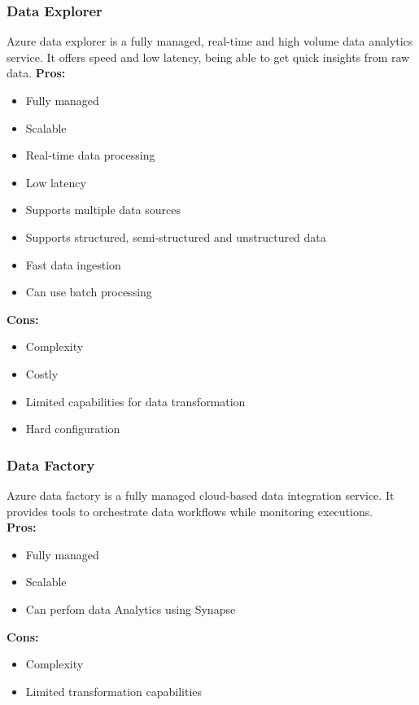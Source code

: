         \subsubsection{Data Explorer}
        \label{azure:data-explorer}
        Azure data explorer is a fully managed, real-time and high volume data analytics service. 
        It offers speed and low latency, being able to get quick insights from raw data.
        \textbf{Pros:}
        \begin{itemize}
            \item Fully managed
            \item Scalable
            \item Real-time data processing
            \item Low latency
            \item Supports multiple data sources
            \item Supports structured, semi-structured and unstructured data
            \item Fast data ingestion
            \item Can use batch processing
        \end{itemize}
        \textbf{Cons:}
        \begin{itemize}
            \item Complexity
            \item Costly
            \item Limited capabilities for data transformation
            \item Hard configuration
        \end{itemize}

        \subsubsection{Data Factory}
        \label{azure:data-factory}
        Azure data factory is a fully managed cloud-based data integration service.
        It provides tools to orchestrate data workflows while monitoring executions.\\
        \textbf{Pros:}
        \begin{itemize}
            \item Fully managed
            \item Scalable
            \item Can perfom data Analytics using Synapse
        \end{itemize}
        \textbf{Cons:}
        \begin{itemize}
            \item Complexity
            \item Limited transformation capabilities
        \end{itemize}


